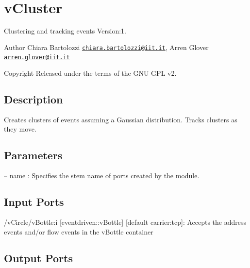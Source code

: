 \hypertarget{group__vCluster}{}\section{v\+Cluster}
\label{group__vCluster}
Clustering and tracking events Version\+:1. \begin{DoxyAuthor}{Author}
Chiara Bartolozzi \href{mailto:chiara.bartolozzi@iit.it}{\tt chiara.\+bartolozzi@iit.\+it}, Arren Glover \href{mailto:arren.glover@iit.it}{\tt arren.\+glover@iit.\+it} ~\newline
 
\end{DoxyAuthor}
\begin{DoxyCopyright}{Copyright}
Released under the terms of the G\+NU G\+PL v2. 
\end{DoxyCopyright}
\hypertarget{group__zynqGrabber_intro_sec}{}\subsection{Description}\label{group__zynqGrabber_intro_sec}
Creates clusters of events assuming a Gaussian distribution. Tracks clusters as they move.\hypertarget{group__zynqGrabber_parameters_sec}{}\subsection{Parameters}\label{group__zynqGrabber_parameters_sec}

\begin{DoxyItemize}
\item -- name \+: Specifies the stem name of ports created by the module. 
\end{DoxyItemize}\hypertarget{group__zynqGrabber_inputports_sec}{}\subsection{Input Ports}\label{group__zynqGrabber_inputports_sec}

\begin{DoxyItemize}
\item /v\+Circle/v\+Bottle\+:i \mbox{[}eventdriven\+::v\+Bottle\mbox{]} \mbox{[}default carrier\+:tcp\mbox{]}\+: Accepts the address events and/or flow events in the v\+Bottle container
\end{DoxyItemize}\hypertarget{group__zynqGrabber_outputports_sec}{}\subsection{Output Ports}\label{group__zynqGrabber_outputports_sec}

